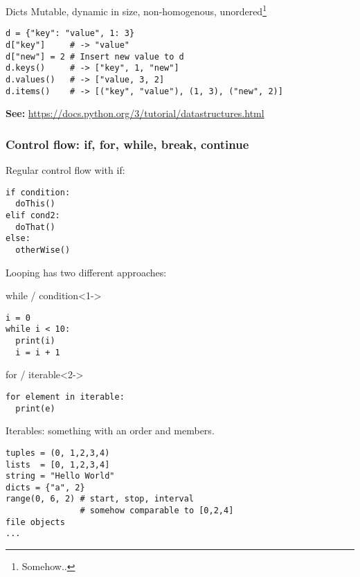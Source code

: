 \documentclass{beamer}
\begin{document}
\begin{frame}[fragile]

    \begin{block}{Dicts}
    Mutable, dynamic in size, non-homogenous, unordered\footnote{Somehow..}
    \begin{verbatim}
d = {"key": "value", 1: 3}
d["key"]     # -> "value"
d["new"] = 2 # Insert new value to d
d.keys()     # -> ["key", 1, "new"]
d.values()   # -> ["value, 3, 2]
d.items()    # -> [("key", "value"), (1, 3), ("new", 2)]
    \end{verbatim}
    \end{block}
\textbf{See: } \url{https://docs.python.org/3/tutorial/datastructures.html}
\end{frame}

\begin{frame}[fragile]
    \frametitle{Control flow: if, for, while, break, continue}
    Regular control flow with if:
    \begin{verbatim}
if condition:
  doThis()
elif cond2:
  doThat()
else:
  otherWise()
    \end{verbatim}
\end{frame}

\begin{frame}[fragile]
Looping has two different approaches:
\begin{block}{while / condition}<1->
    \begin{verbatim}
i = 0
while i < 10:
  print(i)
  i = i + 1
    \end{verbatim}
\end{block}
\begin{block}{for / iterable}<2->
    \begin{verbatim}
for element in iterable:
  print(e)
    \end{verbatim}
\end{block}
\end{frame}

\begin{frame}[fragile]
Iterables: something with an order and members.
\begin{example}
    \begin{verbatim}
tuples = (0, 1,2,3,4)
lists  = [0, 1,2,3,4]
string = "Hello World"
dicts = {"a", 2}
range(0, 6, 2) # start, stop, interval
               # somehow comparable to [0,2,4]
file objects
...
    \end{verbatim}
\end{example}
\end{frame}
\end{document}
